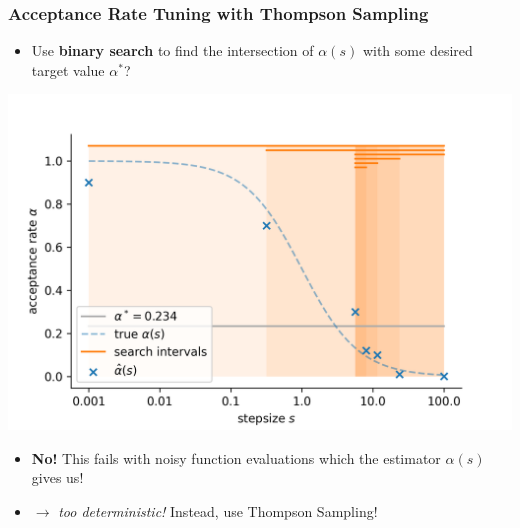 \begin{frame}[c]
    \frametitle{Acceptance Rate Tuning with Thompson Sampling}
    \begin{itemize}
        \item Use \textbf{binary search} to find the intersection of $\alpha(s)$ with some desired target value $\alpha^*$?
    \end{itemize}
    \vspace{-0.8cm}
    \begin{center}
        \includegraphics[scale=0.5]{imgs/nestedintervalsfailure.png}
    \end{center}
    \vspace{-0.5cm}
    \begin{itemize}
        \item \textbf{No!} This fails with noisy function evaluations which the estimator $\hat{\alpha}(s)$ gives us!
        \item[] $\to$ \emph{too deterministic!} Instead, use Thompson Sampling!
    \end{itemize}
\end{frame}

